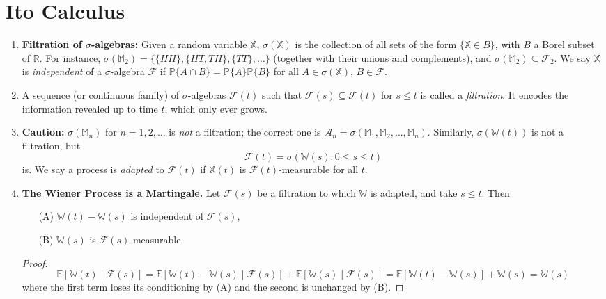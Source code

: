 
\section{Ito Calculus}

\begin{enumerate}
    \item \textbf{Filtration of $\sigma$-algebras:} Given a random variable $\mathbb{X}$, $\sigma(\mathbb{X})$ is the collection of all sets of the form $\{\mathbb{X} \in B\}$, with $B$ a Borel subset of $\mathbb{R}$. For instance, $\sigma(\mathbb{M}_2) = \{\{HH\}, \{HT, TH\}, \{TT\}, \dots\}$ (together with their unions and complements), and $\sigma(\mathbb{M}_2) \subseteq \mathcal{F}_2$. We say $\mathbb{X}$ is \textit{independent} of a $\sigma$-algebra $\mathcal{F}$ if $\mathbb{P}\{A \cap B\} = \mathbb{P}\{A\}\mathbb{P}\{B\}$ for all $A \in \sigma(\mathbb{X})$, $B \in \mathcal{F}$.

    \item A sequence (or continuous family) of $\sigma$-algebras $\mathcal{F}(t)$ such that $\mathcal{F}(s) \subseteq \mathcal{F}(t)$ for $s \leq t$ is called a \textit{filtration}. It encodes the information revealed up to time $t$, which only ever grows.

    \item \textbf{Caution:} $\sigma(\mathbb{M}_n)$ for $n = 1, 2, \dots$ is \textit{not} a filtration; the correct one is $\mathcal{A}_n = \sigma(\mathbb{M}_1, \mathbb{M}_2, \dots, \mathbb{M}_n)$. Similarly, $\sigma(\mathbb{W}(t))$ is not a filtration, but
    \[\mathcal{F}(t) = \sigma(\mathbb{W}(s) : 0 \leq s \leq t)\]
    is. We say a process is \textit{adapted} to $\mathcal{F}(t)$ if $\mathbb{X}(t)$ is $\mathcal{F}(t)$-measurable for all $t$.

    \item \textbf{The Wiener Process is a Martingale.} Let $\mathcal{F}(s)$ be a filtration to which $\mathbb{W}$ is adapted, and take $s \leq t$. Then
    \begin{enumerate}
        \item[(A)] $\mathbb{W}(t) - \mathbb{W}(s)$ is independent of $\mathcal{F}(s)$,
        \item[(B)] $\mathbb{W}(s)$ is $\mathcal{F}(s)$-measurable.
    \end{enumerate}
    \begin{proof}
        $$\mathbb{E}[\mathbb{W}(t) \mid \mathcal{F}(s)] = \mathbb{E}[\mathbb{W}(t) - \mathbb{W}(s) \mid \mathcal{F}(s)] + \mathbb{E}[\mathbb{W}(s) \mid \mathcal{F}(s)] = \mathbb{E}[\mathbb{W}(t) - \mathbb{W}(s)] + \mathbb{W}(s) = \mathbb{W}(s)$$
        where the first term loses its conditioning by (A) and the second is unchanged by (B).
    \end{proof}


\end{enumerate}
